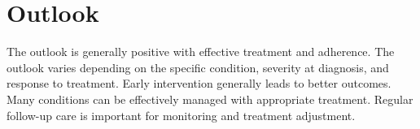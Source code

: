 \section{Outlook}
The outlook is generally positive with effective treatment and adherence. The outlook varies depending on the specific condition, severity at diagnosis, and response to treatment. Early intervention generally leads to better outcomes. Many conditions can be effectively managed with appropriate treatment. Regular follow-up care is important for monitoring and treatment adjustment.
